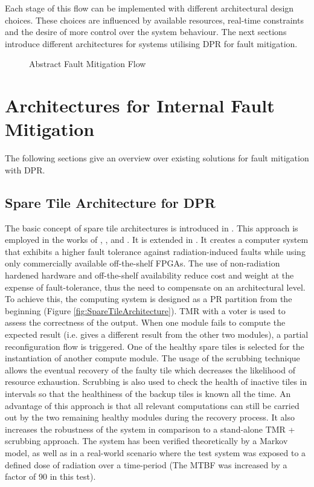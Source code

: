     Each stage of this flow can be implemented with different architectural design choices.
These choices are influenced by available resources, real-time constraints and the desire of more control over the system behaviour.
The next sections introduce different architectures for systems utilising \gls{DPR} for fault mitigation.
\begin{center}
\begin{figure}[h]
    \centering
    \resizebox{\smallColumnWidth}{!} {
        
    }
\caption{Abstract Fault Mitigation Flow}
\label{fig:internalFaultFlow}
\end{figure}
\end{center}
\section{Architectures for Internal Fault Mitigation}\label{InternalFaultsArch}
The following sections give an overview over existing solutions for fault mitigation with \gls{DPR}. 

\subsection{Spare Tile Architecture for \gls{DPR}}\label{sec:SpareTileArchitecture}
The basic concept of spare tile architectures is introduced in \cite{bolchini2007}. 
This approach is employed in the works of \cite{davis2014}, \cite{kastil2012}, \cite{zhang2013} and \cite{lameres_radsat_2015}. 
It is extended in \cite{wilson_hybrid_2017}.
It creates a computer system that exhibits a higher fault tolerance against radiation-induced faults while using only commercially available off-the-shelf \glspl{FPGA}.
The use of non-radiation hardened hardware and off-the-shelf availability reduce cost and weight at the expense of fault-tolerance, thus the need to compensate on an architectural level. 
To achieve this, the computing system is designed as a \gls{PR} partition from the beginning (Figure \ref{fig:SpareTileArchitecture}). 
\gls{TMR} with a voter is used to assess the correctness of the output. 
When one module fails to compute the expected result (i.e. gives a different result from the other two modules), a partial reconfiguration flow is triggered.
One of the healthy spare tiles is selected for the instantiation of another compute module.
The usage of the scrubbing technique allows the eventual recovery of the faulty tile which decreases the likelihood of resource exhaustion. 
Scrubbing is also used to check the health of inactive tiles in intervals so that the healthiness of the backup tiles is known all the time. 
An advantage of this approach is that all relevant computations can still be carried out by the two remaining healthy modules during the recovery process. 
It also increases the robustness of the system in comparison to a stand-alone \gls{TMR} + scrubbing approach.
The system has been verified theoretically by a Markov model, as well as in a real-world scenario where the test system was exposed to a defined dose of radiation over a time-period (The \gls{MTBF} was increased by a factor of 90 in this test).

